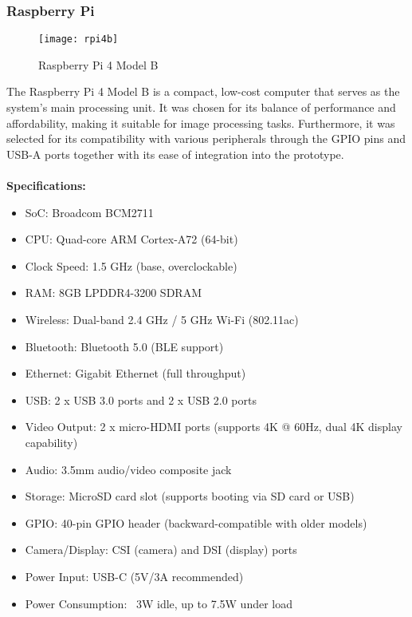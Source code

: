 \subsubsection{Raspberry Pi}
\begin{figure}[!htbp]
	\centering
	\texttt{[image: rpi4b]}
	\caption{Raspberry Pi 4 Model B}
	\label{fig:rpi4b_fig}
\end{figure}
The Raspberry Pi 4 Model B is a compact, low-cost computer that serves as the system's main processing unit. 
It was chosen for its balance of performance and affordability, making it suitable for image processing tasks.
Furthermore, it was selected for its compatibility with various peripherals through the GPIO pins and USB-A ports together
with its ease of integration into the prototype.
\\
\\
\textbf{Specifications:}
\begin{itemize}
    \item SoC: Broadcom BCM2711
    \item CPU: Quad-core ARM Cortex-A72 (64-bit)
    \item Clock Speed: 1.5 GHz (base, overclockable)
    \item RAM: 8GB LPDDR4-3200 SDRAM
    \item Wireless: Dual-band 2.4 GHz / 5 GHz Wi-Fi (802.11ac)
    \item Bluetooth: Bluetooth 5.0 (BLE support)
    \item Ethernet: Gigabit Ethernet (full throughput)
    \item USB: 2 x USB 3.0 ports and 2 x USB 2.0 ports
    \item Video Output: 2 x micro-HDMI ports (supports 4K @ 60Hz, dual 4K display capability)
    \item Audio: 3.5mm audio/video composite jack
    \item Storage: MicroSD card slot (supports booting via SD card or USB)
    \item GPIO: 40-pin GPIO header (backward-compatible with older models)
    \item Camera/Display: CSI (camera) and DSI (display) ports
    \item Power Input: USB-C (5V/3A recommended)
    \item Power Consumption: ~3W idle, up to 7.5W under load
\end{itemize}

